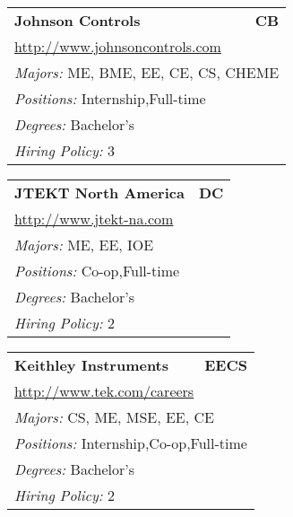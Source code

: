 \documentclass[twoside]{article}
\begin{document}
\begin{center}
\begin{multicols}{3}
\begin{FlushLeft}
\begin{minipage}{.9\columnwidth}
\end{minipage}
 
\begin{minipage}{.9\columnwidth}\begin{tabularx}{.95\columnwidth}{Xr}
                 {\Large\bf Johnson Controls} & {\Large\bf CB}\\
    \multicolumn{2}{p{.95\columnwidth}}{\url{http://www.johnsoncontrols.com}}\\
    \multicolumn{2}{p{.95\columnwidth}}{\emph{Majors:} ME, BME, EE, CE, CS, CHEME}\\
    \multicolumn{2}{p{.95\columnwidth}}{\emph{Positions:} Internship,Full-time}\\
    \multicolumn{2}{p{.95\columnwidth}}{\emph{Degrees:} Bachelor's}\\
    \multicolumn{2}{p{.95\columnwidth}}{\emph{Hiring Policy:} 3}\\
    \end{tabularx}
    
\end{minipage}
 
\begin{minipage}{.9\columnwidth}\begin{tabularx}{.95\columnwidth}{Xr}
                 {\Large\bf JTEKT North America} & {\Large\bf DC}\\
    \multicolumn{2}{p{.95\columnwidth}}{\url{http://www.jtekt-na.com}}\\
    \multicolumn{2}{p{.95\columnwidth}}{\emph{Majors:} ME, EE, IOE}\\
    \multicolumn{2}{p{.95\columnwidth}}{\emph{Positions:} Co-op,Full-time}\\
    \multicolumn{2}{p{.95\columnwidth}}{\emph{Degrees:} Bachelor's}\\
    \multicolumn{2}{p{.95\columnwidth}}{\emph{Hiring Policy:} 2}\\
    \end{tabularx}
    
\end{minipage}
 
\begin{minipage}{.9\columnwidth}\begin{tabularx}{.95\columnwidth}{Xr}
                 {\Large\bf Keithley Instruments} & {\Large\bf EECS}\\
    \multicolumn{2}{p{.95\columnwidth}}{\url{http://www.tek.com/careers}}\\
    \multicolumn{2}{p{.95\columnwidth}}{\emph{Majors:} CS, ME, MSE, EE, CE}\\
    \multicolumn{2}{p{.95\columnwidth}}{\emph{Positions:} Internship,Co-op,Full-time}\\
    \multicolumn{2}{p{.95\columnwidth}}{\emph{Degrees:} Bachelor's}\\
    \multicolumn{2}{p{.95\columnwidth}}{\emph{Hiring Policy:} 2}\\
    \end{tabularx}
    

\end{minipage}
\end{FlushLeft}
\end{multicols}
\end{center}
\end{document}
